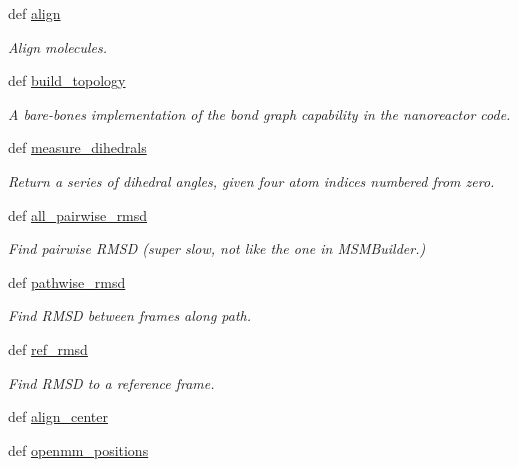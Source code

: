 \begin{DoxyCompactItemize}
def \hyperlink{classforcebalance_1_1molecule_1_1Molecule_a87e66db685214a9cdd4feff49d4ea5dc}{align}
\begin{DoxyCompactList}\small\item\em Align molecules. \end{DoxyCompactList}\item 
def \hyperlink{classforcebalance_1_1molecule_1_1Molecule_a071f18dacd881f761462f772bb0cf632}{build\-\_\-topology}
\begin{DoxyCompactList}\small\item\em A bare-\/bones implementation of the bond graph capability in the nanoreactor code. \end{DoxyCompactList}\item 
def \hyperlink{classforcebalance_1_1molecule_1_1Molecule_aa6b0a08a6579f697667c83e04927298c}{measure\-\_\-dihedrals}
\begin{DoxyCompactList}\small\item\em Return a series of dihedral angles, given four atom indices numbered from zero. \end{DoxyCompactList}\item 
def \hyperlink{classforcebalance_1_1molecule_1_1Molecule_af412b655371674434ec63b4bfea6d8c0}{all\-\_\-pairwise\-\_\-rmsd}
\begin{DoxyCompactList}\small\item\em Find pairwise R\-M\-S\-D (super slow, not like the one in M\-S\-M\-Builder.) \end{DoxyCompactList}\item 
def \hyperlink{classforcebalance_1_1molecule_1_1Molecule_ac0fd89e640485f7216183f9a7601c51f}{pathwise\-\_\-rmsd}
\begin{DoxyCompactList}\small\item\em Find R\-M\-S\-D between frames along path. \end{DoxyCompactList}\item 
def \hyperlink{classforcebalance_1_1molecule_1_1Molecule_a58191a79257fbad7f2c636239bfa7596}{ref\-\_\-rmsd}
\begin{DoxyCompactList}\small\item\em Find R\-M\-S\-D to a reference frame. \end{DoxyCompactList}\item 
def \hyperlink{classforcebalance_1_1molecule_1_1Molecule_aff7a0e2413297088a5bc3e91e5951f3f}{align\-\_\-center}
\item 
def \hyperlink{classforcebalance_1_1molecule_1_1Molecule_a57edc8d72f7e4c1a1452de7b438f3c55}{openmm\-\_\-positions}

\end{DoxyCompactItemize}
